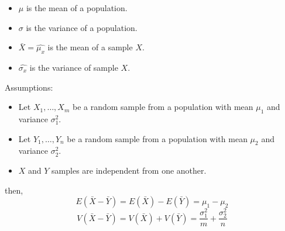 \begin{multicols}{3}


  \begin{itemize}
    \item $\mu$ is the mean of a population.
    \item $\sigma$ is the variance of a population.
    \item $\bar{X} = \hat{\mu_x}$ is the mean of a sample $X$.
    \item $\hat{\sigma_x}$ is the variance of sample $X$.
  \end{itemize}

  \par Assumptions:
  \begin{itemize}
    \item Let $X_1, \ldots, X_m$ be a random sample from a population with mean $\mu_1$ and variance $\sigma_1^2$.
    \item Let $Y_1, \ldots, Y_n$ be a random sample from a population with mean $\mu_2$ and variance $\sigma_2^2$.
    \item $X$ and $Y$ samples are independent from one another.
  \end{itemize}
  then,
  \[
    E(\bar{X} - \bar{Y}) = E(\bar{X}) - E(\bar{Y}) = \mu_1 - \mu_2
  \]
  \[
    V(\bar{X} - \bar{Y}) = V(\bar{X}) + V(\bar{Y}) = \frac{\sigma_1^2}{m} + \frac{\sigma_2^2}{n}
  \]


\end{multicols}
